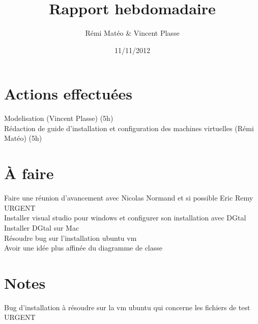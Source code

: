 \documentclass{article}
\title{Rapport hebdomadaire}
\author{Rémi Matéo \& Vincent Plasse}
\date{11/11/2012}
\begin{document}
\maketitle

\section{Actions effectuées}
Modelisation (Vincent Plasse) (5h) \\
Rédaction de guide d'installation et configuration des machines virtuelles (Rémi Matéo) (5h) \\


\section{À faire}
Faire une réunion d'avancement avec Nicolas Normand et si possible Eric Remy URGENT \\
Installer visual studio pour windows et configurer son installation avec DGtal \\
Installer DGtal sur Mac \\
Résoudre bug sur l'installation ubuntu vm \\
Avoir une idée plus affinée du diagramme de classe \\


\section{Notes}
Bug d'installation à résoudre sur la vm ubuntu qui concerne les fichiers de test URGENT \\
\end{document}

